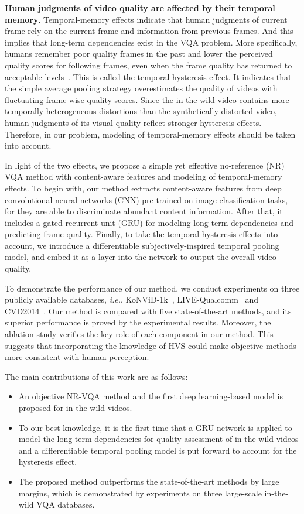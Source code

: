 \documentclass[sigconf]{acmart}
\begin{document}
\textbf{Human judgments of video quality are affected by their temporal memory}. 
Temporal-memory effects indicate that human judgments of current frame rely on the current frame and information from previous frames. And this implies that long-term dependencies exist in the VQA problem. 
More specifically, humans remember poor quality frames in the past and lower the perceived quality scores for following frames, even when the frame quality has returned to acceptable levels~\cite{seshadrinathan2011temporal}. 
This is called the temporal hysteresis effect.
It indicates that the simple average pooling strategy overestimates the quality of videos with fluctuating frame-wise quality scores. 
Since the in-the-wild video contains more temporally-heterogeneous distortions than the synthetically-distorted video, human judgments of its visual quality reflect stronger hysteresis effects.
Therefore, in our problem, modeling of temporal-memory effects should be taken into account.
 
In light of the two effects, we propose a simple yet effective no-reference (NR) VQA method with content-aware features and modeling of temporal-memory effects.
To begin with, our method extracts content-aware features from deep convolutional neural networks (CNN) pre-trained on image classification tasks, for they are able to discriminate abundant content information. 
After that, it includes a gated recurrent unit (GRU) for  modeling long-term dependencies and predicting frame quality.
Finally, to take the temporal hysteresis effects into account, we introduce a differentiable subjectively-inspired temporal pooling model, and embed it as a layer into the network to output the overall video quality. 

To demonstrate the performance of our method, we conduct experiments on three publicly available databases, \textit{i.e.}, KoNViD-1k~\cite{hosu2017konstanz}, LIVE-Qualcomm~\cite{ghadiyaram2018capture} and CVD2014~\cite{nuutinen2016cvd2014}. 
Our method is compared with five state-of-the-art methods, and its superior performance is proved by the experimental results. 
Moreover, the ablation study verifies the key role of each component in our method. 
This suggests that incorporating the knowledge of HVS could make objective methods more consistent with human perception.

The main contributions of this work are as follows:

\begin{itemize}
\item An objective NR-VQA method and the first deep learning-based model is proposed for in-the-wild videos.
\item To our best knowledge, it is the first time that a GRU network is applied to model the long-term dependencies for quality assessment of in-the-wild videos and a differentiable temporal pooling model is put forward to account for the hysteresis effect.
\item The proposed method outperforms the state-of-the-art methods by large margins, which is demonstrated by experiments on three large-scale in-the-wild VQA databases.
\end{itemize}
\end{document}
